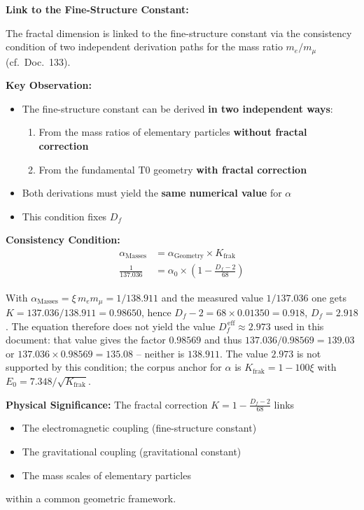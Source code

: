 	\begin{derivation}
		\textbf{Link to the Fine-Structure Constant:}
		
		The fractal dimension is linked to the fine-structure constant via the consistency condition of two independent derivation paths for the mass ratio $m_e/m_\mu$ (cf.\ Doc.~133).
		
		\textbf{Key Observation:}
		\begin{itemize}
			\item The fine-structure constant can be derived \textbf{in two independent ways}:
			\begin{enumerate}
				\item From the mass ratios of elementary particles \textbf{without fractal correction}
				\item From the fundamental T0 geometry \textbf{with fractal correction}
			\end{enumerate}
			\item Both derivations must yield the \textbf{same numerical value} for $\alpha$
			\item This condition fixes $D_f$
		\end{itemize}
		
		\textbf{Consistency Condition:}
		\begin{align}
			\alpha_{\text{Masses}} &= \alpha_{\text{Geometry}} \times K_{\text{frak}} \\
			\frac{1}{137.036} &= \alpha_0 \times \left(1 - \frac{D_f - 2}{68}\right)
		\end{align}
		
		With $\alpha_{\text{Masses}} = \xi\,m_e m_\mu = 1/138.911$ and the measured value $1/137.036$ one gets $K = 137.036/138.911 = 0.98650$, hence $D_f - 2 = 68 \times 0.01350 = 0.918$, $D_f = 2.918$. The equation therefore does not yield the value $D_f^{\,\text{eff}} \approx 2.973$ used in this document: that value gives the factor $0.98569$ and thus $137.036/0.98569 = 139.03$ or $137.036 \times 0.98569 = 135.08$ -- neither is $138.911$. The value $2.973$ is not supported by this condition; the corpus anchor for $\alpha$ is $K_{\text{frak}} = 1 - 100\xi$ with $E_0 = 7.348/\sqrt{K_{\text{frak}}}$.
		
		\textbf{Physical Significance:}
		The fractal correction $K = 1 - \frac{D_f - 2}{68}$ links
		\begin{itemize}
			\item The electromagnetic coupling (fine-structure constant)
			\item The gravitational coupling (gravitational constant)
			\item The mass scales of elementary particles
		\end{itemize}
		within a common geometric framework.
	\end{derivation}
	
